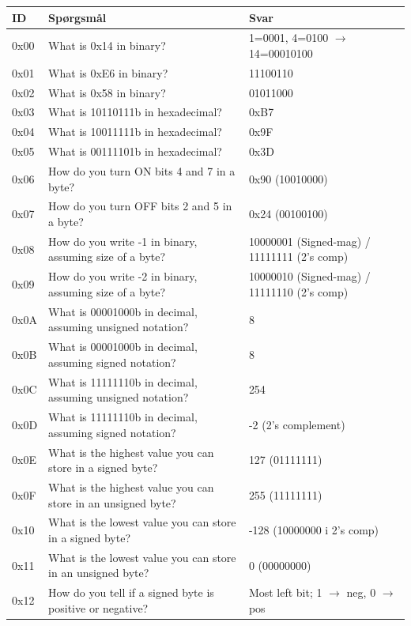\keepXColumns
\begin{tabularx}{\textwidth}{|l|X|X|}
\hline
\textbf{ID} & \textbf{Spørgsmål} & \textbf{Svar} \\ \hline
\endhead

0x00 & What is 0x14 in binary? & 1=0001, 4=0100 $\rightarrow$ 14=00010100 \\ \hline
0x01 & What is 0xE6 in binary? & 11100110 \\ \hline
0x02 & What is 0x58 in binary? & 01011000 \\ \hline
0x03 & What is 10110111b in hexadecimal? & 0xB7 \\ \hline
0x04 & What is 10011111b in hexadecimal? & 0x9F \\ \hline
0x05 & What is 00111101b in hexadecimal? & 0x3D \\ \hline
0x06 & How do you turn ON bits 4 and 7 in a byte? & 0x90 (10010000) \\ \hline
0x07 & How do you turn OFF bits 2 and 5 in a byte? & 0x24 (00100100) \\ \hline
0x08 & How do you write -1 in binary, assuming size of a byte? & 10000001 (Signed-mag) / 11111111 (2's comp) \\ \hline
0x09 & How do you write -2 in binary, assuming size of a byte? & 10000010 (Signed-mag) / 11111110 (2's comp) \\ \hline
0x0A & What is 00001000b in decimal, assuming unsigned notation? & 8 \\ \hline
0x0B & What is 00001000b in decimal, assuming signed notation? & 8 \\ \hline
0x0C & What is 11111110b in decimal, assuming unsigned notation? & 254 \\ \hline
0x0D & What is 11111110b in decimal, assuming signed notation? & -2 (2's complement) \\ \hline
0x0E & What is the highest value you can store in a signed byte? & 127 (01111111) \\ \hline
0x0F & What is the highest value you can store in an unsigned byte? & 255 (11111111) \\ \hline
0x10 & What is the lowest value you can store in a signed byte? & -128 (10000000 i 2's comp) \\ \hline
0x11 & What is the lowest value you can store in an unsigned byte? & 0 (00000000) \\ \hline
0x12 & How do you tell if a signed byte is positive or negative? & Most left bit; 1 $\rightarrow$ neg, 0 $\rightarrow$ pos \\ \hline

\end{tabularx}
